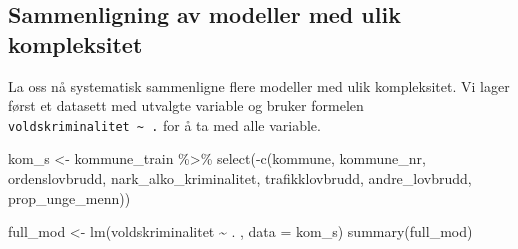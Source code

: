\documentclass[
  letterpaper,
  DIV=11,
  numbers=noendperiod]{scrreprt}
\newenvironment{Shaded}{\begin{snugshade}}{\end{snugshade}}
\newcommand{\AttributeTok}[1]{\textcolor[rgb]{0.40,0.45,0.13}{#1}}
\newcommand{\FunctionTok}[1]{\textcolor[rgb]{0.28,0.35,0.67}{#1}}
\newcommand{\NormalTok}[1]{\textcolor[rgb]{0.00,0.23,0.31}{#1}}
\newcommand{\OtherTok}[1]{\textcolor[rgb]{0.00,0.23,0.31}{#1}}
\newcommand{\SpecialCharTok}[1]{\textcolor[rgb]{0.37,0.37,0.37}{#1}}
\begin{document}
\subsection{Sammenligning av modeller med ulik
kompleksitet}\label{sammenligning-av-modeller-med-ulik-kompleksitet}

La oss nå systematisk sammenligne flere modeller med ulik kompleksitet.
Vi lager først et datasett med utvalgte variable og bruker formelen
\texttt{voldskriminalitet\ \textasciitilde{}\ .} for å ta med alle
variable.

\begin{Shaded}
\begin{Highlighting}[]
\NormalTok{kom\_s }\OtherTok{\textless{}{-}}\NormalTok{ kommune\_train }\SpecialCharTok{\%\textgreater{}\%}
  \FunctionTok{select}\NormalTok{(}\SpecialCharTok{{-}}\FunctionTok{c}\NormalTok{(kommune, kommune\_nr, ordenslovbrudd,}
\NormalTok{            nark\_alko\_kriminalitet, trafikklovbrudd, andre\_lovbrudd,}
\NormalTok{            prop\_unge\_menn))}

\NormalTok{full\_mod }\OtherTok{\textless{}{-}} \FunctionTok{lm}\NormalTok{(voldskriminalitet }\SpecialCharTok{\textasciitilde{}}\NormalTok{ . , }\AttributeTok{data =}\NormalTok{ kom\_s)}
\FunctionTok{summary}\NormalTok{(full\_mod)}
\end{Highlighting}
\end{Shaded}
\end{document}
